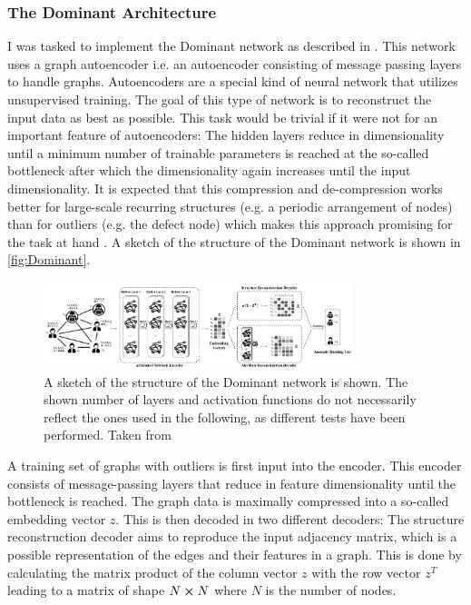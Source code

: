 \documentclass[11pt,a4paper]{article}
\begin{document}
\subsubsection{The Dominant Architecture}
I was tasked to implement the Dominant network as described in \cite{dingDeepAnomalyDetection2019}. 
This network uses a graph autoencoder i.e. an autoencoder consisting of message passing layers to handle graphs. 
Autoencoders are a special kind of neural network that utilizes unsupervised training. 
The goal of this type of network is to reconstruct the input data as best as possible. 
This task would be trivial if it were not for an important feature of autoencoders: 
The hidden layers reduce in dimensionality until a minimum number of trainable parameters is reached at the so-called bottleneck after which the dimensionality again increases until the input dimensionality. 
It is expected that this compression and de-compression works better for large-scale recurring structures (e.g. a periodic arrangement of nodes) than for outliers (e.g. the defect node) which makes this approach promising for the task at hand \cite{dingDeepAnomalyDetection2019}. 
A sketch of the structure of the Dominant network is shown in \autoref{fig:Dominant}.
\begin{figure}[htbp]
\centering
\includegraphics[width=0.8\textwidth]{images/ding_1.png}
\caption{A sketch of the structure of the Dominant network is shown. The shown number of layers and activation functions do not necessarily reflect the ones used in the following, as different tests have been performed. Taken from \cite[Fig.1]{dingDeepAnomalyDetection2019}}
\label{fig:Dominant}
\end{figure}
A training set of graphs with outliers is first input into the encoder. 
This encoder consists of message-passing layers that reduce in feature dimensionality until the bottleneck is reached. 
The graph data is maximally compressed into a so-called embedding vector $z$. 
This is then decoded in two different decoders: 
The structure reconstruction decoder aims to reproduce the input adjacency matrix, which is a possible representation of the edges and their features in a graph. 
This is done by calculating the matrix product of the column vector $z$ with the row vector $z^T$ leading to a matrix of shape $N\cross N$ where $N$ is the number of nodes. 
\end{document}
